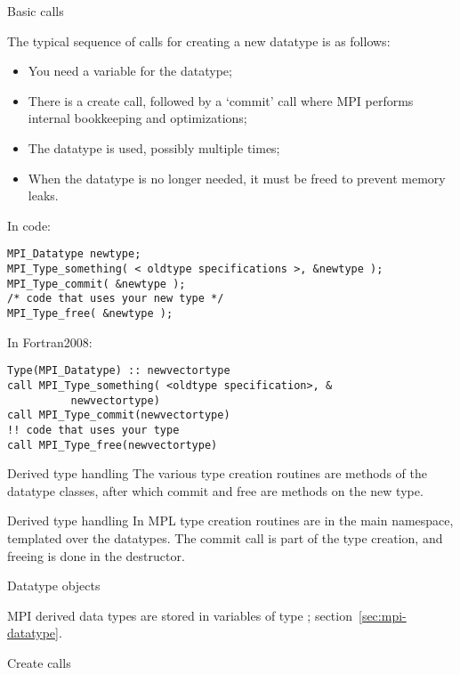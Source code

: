  {Basic calls}
\label{sec:data-commit}

The typical sequence of calls for creating a new datatype is as follows:
\begin{itemize}
\item You need a variable for the datatype;
\item There is a create call, followed by a `commit' call where MPI
  performs internal bookkeeping and optimizations;
\item The datatype is used, possibly multiple times;
\item When the datatype is no longer needed, it must be freed to prevent memory leaks.
\end{itemize}
In code:
\begin{lstlisting}
MPI_Datatype newtype;
MPI_Type_something( < oldtype specifications >, &newtype );
MPI_Type_commit( &newtype );
/* code that uses your new type */
MPI_Type_free( &newtype );
\end{lstlisting}

In Fortran2008:
\lstset{language=Fortran}
\begin{lstlisting}
Type(MPI_Datatype) :: newvectortype
call MPI_Type_something( <oldtype specification>, &
          newvectortype)
call MPI_Type_commit(newvectortype)
!! code that uses your type
call MPI_Type_free(newvectortype)
\end{lstlisting}
\lstset{language=C}

\begin{pythonnote}{Derived type handling}
  The various type creation routines are methods
  of the datatype classes, after which commit and free are
  methods on the new type.
\end{pythonnote}

\begin{mplnote}{Derived type handling}
  \label{mpl:derived}
  In \ac{MPL} type creation routines are in the main namespace,
  templated over the datatypes.
  The commit call is part of the type creation,
  and freeing is done in the destructor.
\end{mplnote}

 {Datatype objects}
\label{sec:mpi-datatype}

MPI derived data types are stored in variables of type
;
section~\ref{sec:mpi-datatype}.

 {Create calls}

